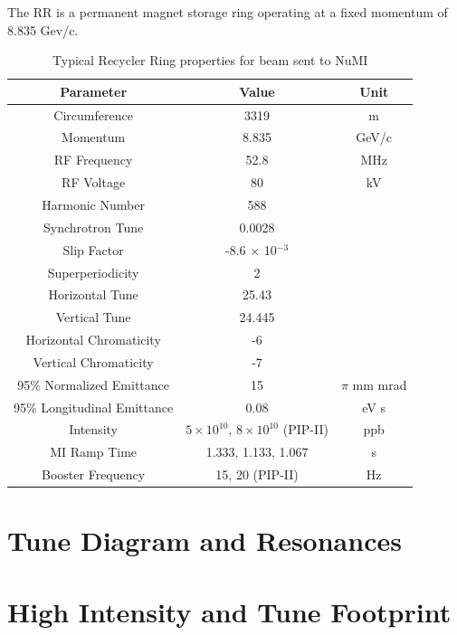 The RR is a permanent magnet storage ring operating at a fixed momentum of 8.835 Gev/c.

\begin{table}[]
\centering
\caption{Typical Recycler Ring properties for beam sent to NuMI}
\label{tab:rrparams}
\begin{tabular}{@{}ccc@{}}
\toprule
\textbf{Parameter}          & \textbf{Value}                             & \textbf{Unit} \\ \midrule
Circumference               & 3319                                       & m             \\
Momentum                    & 8.835                                      & GeV/c         \\
RF Frequency                & 52.8                                       & MHz           \\
RF Voltage                  & 80                                         & kV            \\
Harmonic Number             & 588                                        &               \\
Synchrotron Tune            & 0.0028                                     &               \\
Slip Factor                 & -8.6 $\times$ 10$^{-3}$                    &               \\
Superperiodicity            & 2                                          &               \\
Horizontal Tune             & 25.43                                      &               \\
Vertical Tune               & 24.445                                     &               \\
Horizontal Chromaticity     & -6                                         &               \\
Vertical Chromaticity       & -7                                         &               \\
95\% Normalized Emittance   & 15                                         & $\pi$ mm mrad \\
95\% Longitudinal Emittance & 0.08                                       & eV s          \\
Intensity                   & $5\times10^{10}$, $8\times10^{10}$ (PIP-II) & ppb           \\
MI Ramp Time                & 1.333, 1.133, 1.067                        & s             \\
Booster Frequency           & 15, 20 (PIP-II)                            & Hz            \\ \bottomrule
\end{tabular}
\end{table}

\section{Tune Diagram and Resonances}

\section{High Intensity and Tune Footprint}
